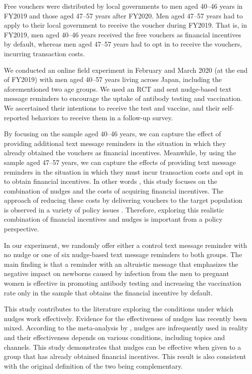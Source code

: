 \documentclass[
      12pt,
    a4paper
]{article}
\begin{document}
Free vouchers were distributed by local governments to men aged 40--46 years in FY2019 and those aged 47--57 years after FY2020. Men aged 47--57 years had to apply to their local government to receive the voucher during FY2019. That is, in FY2019, men aged 40--46 years received the free vouchers as financial incentives by default, whereas men aged 47--57 years had to opt in to receive the vouchers, incurring transaction costs.

We conducted an online field experiment in February and March 2020 (at the end of FY2019) with men aged 40--57 years living across Japan, including the aforementioned two age groups. We used an RCT and sent nudge-based text message reminders to encourage the uptake of antibody testing and vaccination. We ascertained their intentions to receive the test and vaccine, and their self-reported behaviors to receive them in a follow-up survey.

By focusing on the sample aged 40--46 years, we can capture the effect of providing additional text message reminders in the situation in which they already obtained the vouchers as financial incentives. Meanwhile, by using the sample aged 47--57 years, we can capture the effects of providing text message reminders in the situation in which they must incur transaction costs and opt in to obtain financial incentives. In other words , this study focuses on the combination of nudges and the costs of acquiring financial incentives. The approach of reducing these costs by delivering vouchers to the target population is observed in a variety of policy issues \citep[e.g.,][]{Ahmed2011, Kacker2022}. Therefore, exploring this realistic combination of financial incentives and nudges is important from a policy perspective.

In our experiment, we randomly offer either a control text message reminder with no nudge or one of six nudge-based text message reminders to both groups. The main finding is that a reminder with an altruistic message that emphasizes the negative impact on newborns caused by infection from the men to pregnant women is effective in promoting antibody testing and increasing the vaccination rate only in the sample that obtains the financial incentive by default.

This study contributes to the literature exploring the conditions under which nudges work effectively. Evidence for the effectiveness of nudges has recently been mixed. According to the meta-analysis by \citet{DellaVigna2022a}, nudges are infrequently used in reality and their effectiveness depends on various conditions, including topics and channels. This study demonstrates that nudges can be effective when given to a group that has already obtained financial incentives. This result is also consistent with the original definition of the two being complementary.
\end{document}
